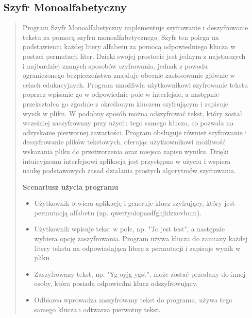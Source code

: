 \documentclass[12pt,a4paper]{article}
\begin{document}
\subsection{Szyfr Monoalfabetyczny}
\begin{quotation} \noindent Program Szyfr Monoalfabetyczny implementuje szyfrowanie i deszyfrowanie tekstu za pomocą szyfru monoalfabetycznego. Szyfr ten polega na podstawieniu każdej litery alfabetu za pomocą odpowiedniego klucza w postaci permutacji liter. Dzięki swojej prostocie jest jednym z najstarszych i najbardziej znanych sposobów szyfrowania, jednak z powodu ograniczonego bezpieczeństwa znajduje obecnie zastosowanie głównie w celach edukacyjnych. Program umożliwia użytkownikowi szyfrowanie tekstu poprzez wpisanie go w odpowiednie pole w interfejsie, a następnie przekształca go zgodnie z określonym kluczem szyfrującym i zapisuje wynik w pliku. W podobny sposób można odszyfrować tekst, który został wcześniej zaszyfrowany przy użyciu tego samego klucza, co pozwala na odzyskanie pierwotnej zawartości. Program obsługuje również szyfrowanie i deszyfrowanie plików tekstowych, oferując użytkownikowi możliwość wskazania pliku do przetworzenia oraz miejsca zapisu wyniku. Dzięki intuicyjnemu interfejsowi aplikacja jest przystępna w użyciu i wspiera naukę podstawowych zasad działania prostych algorytmów szyfrowania.\newline

\noindent\textbf{Scenariusz użycia programu}
\begin{itemize}
\item Użytkownik otwiera aplikację i generuje klucz szyfrujący, który jest permutacją alfabetu (np. qwertyuiopasdfghjklzxcvbnm).
\item Użytkownik wpisuje tekst w pole, np. "To jest test", a następnie wybiera opcję zaszyfrowania. Program używa klucza do zamiany każdej litery tekstu na odpowiadającą literę z permutacji i zapisuje wynik w pliku.
\item Zaszyfrowany tekst, np. "Yg oyjg ygst", może zostać przesłany do innej osoby, która posiada odpowiedni klucz odszyfrowujący.
\item Odbiorca wprowadza zaszyfrowany tekst do programu, używa tego samego klucza i odtwarza pierwotny tekst.
\end{itemize}
\end{quotation}
\end{document}

